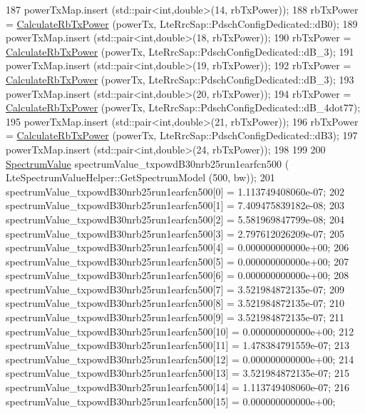 \begin{DoxyCode}
187     powerTxMap.insert (std::pair<int,double>(14, rbTxPower));
188     rbTxPower = \hyperlink{classLteDownlinkPowerControlTestSuite_acbda226a1db61d5328141d80aca96447}{CalculateRbTxPower} (powerTx, LteRrcSap::PdschConfigDedicated::dB0);
189     powerTxMap.insert (std::pair<int,double>(18, rbTxPower));
190     rbTxPower = \hyperlink{classLteDownlinkPowerControlTestSuite_acbda226a1db61d5328141d80aca96447}{CalculateRbTxPower} (powerTx, LteRrcSap::PdschConfigDedicated::dB\_3);
191     powerTxMap.insert (std::pair<int,double>(19, rbTxPower));
192     rbTxPower = \hyperlink{classLteDownlinkPowerControlTestSuite_acbda226a1db61d5328141d80aca96447}{CalculateRbTxPower} (powerTx, LteRrcSap::PdschConfigDedicated::dB\_3);
193     powerTxMap.insert (std::pair<int,double>(20, rbTxPower));
194     rbTxPower = \hyperlink{classLteDownlinkPowerControlTestSuite_acbda226a1db61d5328141d80aca96447}{CalculateRbTxPower} (powerTx, LteRrcSap::PdschConfigDedicated::dB\_4dot77);
195     powerTxMap.insert (std::pair<int,double>(21, rbTxPower));
196     rbTxPower = \hyperlink{classLteDownlinkPowerControlTestSuite_acbda226a1db61d5328141d80aca96447}{CalculateRbTxPower} (powerTx, LteRrcSap::PdschConfigDedicated::dB3);
197     powerTxMap.insert (std::pair<int,double>(24, rbTxPower));
198 
199 
200     \hyperlink{classns3_1_1SpectrumValue}{SpectrumValue} spectrumValue\_txpowdB30nrb25run1earfcn500 (
      LteSpectrumValueHelper::GetSpectrumModel (500, bw));
201     spectrumValue\_txpowdB30nrb25run1earfcn500[0] = 1.113749408060e-07;
202     spectrumValue\_txpowdB30nrb25run1earfcn500[1] = 7.409475839182e-08;
203     spectrumValue\_txpowdB30nrb25run1earfcn500[2] = 5.581969847799e-08;
204     spectrumValue\_txpowdB30nrb25run1earfcn500[3] = 2.797612026209e-07;
205     spectrumValue\_txpowdB30nrb25run1earfcn500[4] = 0.000000000000e+00;
206     spectrumValue\_txpowdB30nrb25run1earfcn500[5] = 0.000000000000e+00;
207     spectrumValue\_txpowdB30nrb25run1earfcn500[6] = 0.000000000000e+00;
208     spectrumValue\_txpowdB30nrb25run1earfcn500[7] = 3.521984872135e-07;
209     spectrumValue\_txpowdB30nrb25run1earfcn500[8] = 3.521984872135e-07;
210     spectrumValue\_txpowdB30nrb25run1earfcn500[9] = 3.521984872135e-07;
211     spectrumValue\_txpowdB30nrb25run1earfcn500[10] = 0.000000000000e+00;
212     spectrumValue\_txpowdB30nrb25run1earfcn500[11] = 1.478384791559e-07;
213     spectrumValue\_txpowdB30nrb25run1earfcn500[12] = 0.000000000000e+00;
214     spectrumValue\_txpowdB30nrb25run1earfcn500[13] = 3.521984872135e-07;
215     spectrumValue\_txpowdB30nrb25run1earfcn500[14] = 1.113749408060e-07;
216     spectrumValue\_txpowdB30nrb25run1earfcn500[15] = 0.000000000000e+00;

\end{DoxyCode}
